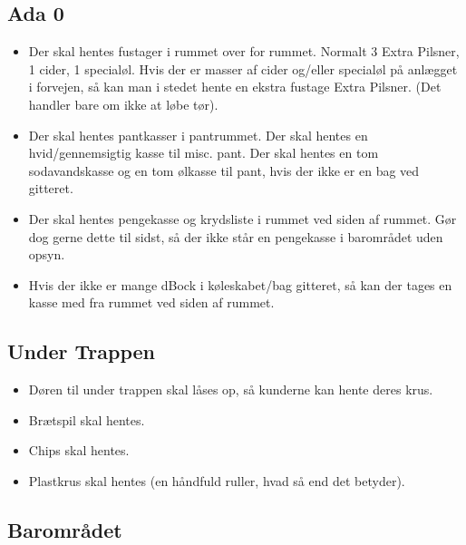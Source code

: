 \subsection{Ada 0}
\label{sec:pre:ada}

\begin{itemize}
\item Der skal hentes fustager i rummet over for rummet. Normalt 3
  Extra Pilsner, 1 cider, 1 specialøl. Hvis der er masser af cider
  og/eller specialøl på anlægget i forvejen, så kan man i stedet hente
  en ekstra fustage Extra Pilsner. (Det handler bare om ikke at løbe
  tør).
\item Der skal hentes pantkasser i pantrummet. Der skal hentes en
  hvid/gennemsigtig kasse til misc. pant. Der skal hentes en tom
  sodavandskasse og en tom ølkasse til pant, hvis der ikke er en bag
  ved gitteret.
\item Der skal hentes pengekasse og krydsliste i rummet ved siden af
  rummet. Gør dog gerne dette til sidst, så der ikke står en
  pengekasse i barområdet uden opsyn.
\item Hvis der ikke er mange dBock\texttrademark{} i køleskabet/bag gitteret, så kan
  der tages en kasse med fra rummet ved siden af rummet.
\end{itemize}


\subsection{Under Trappen}
\label{sec:pre:under-trappen}

\begin{itemize}
\item Døren til under trappen skal låses op, så kunderne kan hente
  deres krus.
\item Brætspil skal hentes.
\item Chips skal hentes.
\item Plastkrus skal hentes (en håndfuld ruller, hvad så end det
  betyder).
\end{itemize}

\subsection{Barområdet}
\label{sec:pre:baromradet}

